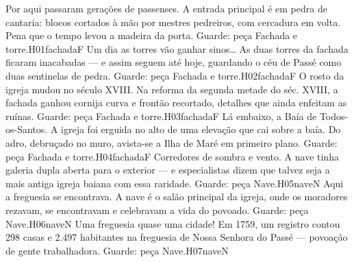 



\linhacartas
{
{Por aqui passaram gerações de passenses.}
{A entrada principal é em pedra de cantaria: blocos cortados à mão por mestres pedreiros, com cercadura em volta. Pena que o tempo levou a madeira da porta.}
{Guarde: peça Fachada e torre.}{H01}{fachada}{F}}
{
{Um dia as torres vão ganhar sinos\ldots}
{As duas torres da fachada ficaram inacabadas --- e assim seguem até hoje, guardando o céu de Passé como duas sentinelas de pedra.}
{Guarde: peça Fachada e torre.}{H02}{fachada}{F}}
{
{O rosto da igreja mudou no século XVIII.}
{Na reforma da segunda metade do séc. XVIII, a fachada ganhou cornija curva e frontão recortado, detalhes que ainda enfeitam as ruínas.}
{Guarde: peça Fachada e torre.}{H03}{fachada}{F}}
\linhacartas
{
{Lá embaixo, a Baía de Todos-os-Santos.}
{A igreja foi erguida no alto de uma elevação que cai sobre a baía. Do adro, debruçado no muro, avista-se a Ilha de Maré em primeiro plano.}
{Guarde: peça Fachada e torre.}{H04}{fachada}{F}}
{
{Corredores de sombra e vento.}
{A nave tinha galeria dupla aberta para o exterior --- e especialistas dizem que talvez seja a mais antiga igreja baiana com essa raridade.}
{Guarde: peça Nave.}{H05}{nave}{N}}
{
{Aqui a freguesia se encontrava.}
{A nave é o salão principal da igreja, onde os moradores rezavam, se encontravam e celebravam a vida do povoado.}
{Guarde: peça Nave.}{H06}{nave}{N}}
\linhacartas
{
{Uma freguesia quase uma cidade!}
{Em 1759, um registro contou 298 casas e 2.497 habitantes na freguesia de Nossa Senhora do Passé --- povoação de gente trabalhadora.}
{Guarde: peça Nave.}{H07}{nave}{N}}
